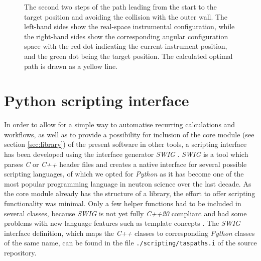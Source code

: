 \begin{figure}[htb]
\begin{center}
		\end{center}
	\caption[Case study: Path 2/2.]{The second two steps of the path leading from the start
		to the target position and avoiding the collision with the outer wall.
		The left-hand sides show the real-space instrumental configuration, while the right-hand
		sides show the corresponding angular configuration space with the red dot indicating the
		current instrument position, and the green dot being the target position.
		The calculated optimal path is drawn as a yellow line.
		\label{fig:casestudy_sequence2}}
\end{figure}



\section{Python scripting interface}
\label{sec:scripting}

In order to allow for a simple way to automatise recurring calculations and workflows, as well as to provide
a possibility for inclusion of the core module (see section \ref{sec:library}) of the present 
software in other tools, a scripting interface has been developed using the interface generator \textit{SWIG} \cite{web_swig}. 
\textit{SWIG} is a tool which parses \textit{C} or \textit{C++} header files and creates a native interface 
for several possible scripting languages, of which we opted for \textit{Python} \cite{Rossum2011, web_python} 
as it has become one of the most popular programming language in neutron science over the last decade.
As the core module already has the structure of a library, the effort to offer scripting functionality
was minimal. Only a few helper functions had to be included in several classes, because \textit{SWIG}
is not yet fully \textit{C++20} compliant and had some problems with new language features such as 
template concepts \cite{cppwiki_concepts}.
The \textit{SWIG} interface definition, which maps the \textit{C++} classes to corresponding \textit{Python} 
classes of the same name, can be found in the file \lstinline|./scripting/taspaths.i| of the source repository.

